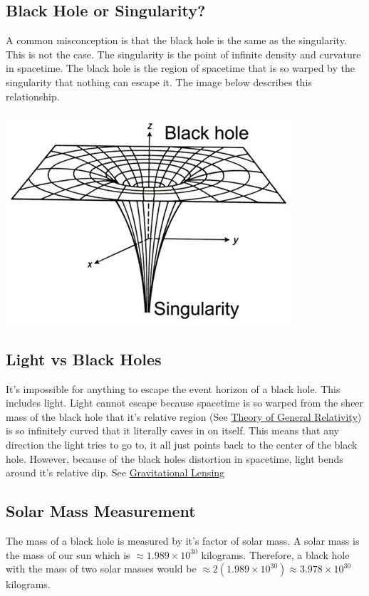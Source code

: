 \documentclass{article}
\begin{document}
\subsection{Black Hole or Singularity?}
A common misconception is that the black hole is the same as the singularity. This is not the case. The singularity is the point of infinite density and curvature in spacetime. The black hole is the region of spacetime that is so warped by the singularity that nothing can escape it. The image below describes this relationship.\\\\
\includegraphics[scale=0.5]{images/black_hole.png}

\subsection{Light vs Black Holes}
It's impossible for anything to escape the event horizon of a black hole. This includes light. Light cannot escape because spacetime is so warped from the sheer mass of the black hole that it's relative region (See \hyperref[sec:generalrelativity]{Theory of General Relativity}) is so infinitely curved that it literally caves in on itself. This means that any direction the light tries to go to, it all just points back to the center of the black hole.
However, because of the black holes distortion in spacetime, light bends around it's relative dip. See \hyperref[sec:gravitational_lensing]{Gravitational Lensing}

\subsection{Solar Mass Measurement}
The mass of a black hole is measured by it's factor of solar mass. A solar mass is the mass of our sun which is \hyperref[constants]{$\approx 1.989 \times 10^{30}$} kilograms. Therefore, a black hole with the mass of two solar masses would be $\approx 2(1.989 \times 10^{30}) \approx 3.978 \times 10^{30}$ kilograms.
\end{document}
